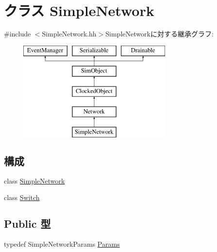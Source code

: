 \hypertarget{classSimpleNetwork}{
\section{クラス SimpleNetwork}
\label{classSimpleNetwork}
}


{\ttfamily \#include $<$SimpleNetwork.hh$>$}SimpleNetworkに対する継承グラフ:\begin{figure}[H]
\begin{center}
\leavevmode
\includegraphics[height=5cm]{classSimpleNetwork}
\end{center}
\end{figure}
\subsection*{構成}
\begin{DoxyCompactItemize}
\item 
class \hyperlink{classSimpleNetwork_1_1SimpleNetwork}{SimpleNetwork}
\item 
class \hyperlink{classSimpleNetwork_1_1Switch}{Switch}
\end{DoxyCompactItemize}
\subsection*{Public 型}
\begin{DoxyCompactItemize}
\item 
typedef SimpleNetworkParams \hyperlink{classSimpleNetwork_acfd32ca05df7999ec705e4800d022dbf}{Params}
\end{DoxyCompactItemize}

